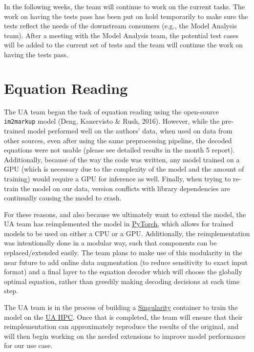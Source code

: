 \documentclass[article, 12pt, oneside]{memoir}
\begin{document}
In the following weeks, the team will continue to work on the current
tasks. The work on having the tests pass has been put on hold
temporarily to make sure the tests reflect the needs of the downstream
consumers (e.g., the Model Analysis team). After a meeting with the
Model Analysis team, the potential test cases will be added to the
current set of tests and the team will continue the work on having the
tests pass.

\hypertarget{equation-reading}{%
\section{Equation Reading}\label{equation-reading}}

The UA team began the task of equation reading using the open-source
\texttt{im2markup} model (Deng, Kanervisto \& Rush, 2016). However,
while the pre-trained model performed well on the authors' data, when
used on data from other sources, even after using the same preprocessing
pipeline, the decoded equations were not usable (please see detailed
results in the month 5 report). Additionally, because of the way the
code was written, any model trained on a GPU (which is necessary due to
the complexity of the model and the amount of training) would require a
GPU for inference as well. Finally, when trying to re-train the model on
our data, version conflicts with library dependencies are continually
causing the model to crash.

For these reasons, and also because we ultimately want to extend the
model, the UA team has reimplemented the model in
\href{https://pytorch.org/}{PyTorch}, which allows for trained models to
be used on either a CPU or a GPU. Additionally, the reimplementation was
intentionally done in a modular way, such that components can be
replaced/extended easily. The team plans to make use of this modularity
in the near future to add online data augmentation (to reduce
sensitivity to exact input format) and a final layer to the equation
decoder which will choose the globally optimal equation, rather than
greedily making decoding decisions at each time step.

The UA team is in the process of building a
\href{https://singularityhub.com/}{Singularity} container to train the
model on the
\href{https://it.arizona.edu/service/high-performance-computing}{UA
HPC}. Once that is completed, the team will ensure that their
reimplementation can approximately reproduce the results of the
original, and will then begin working on the needed extensions to
improve model performance for our use case.
\end{document}
